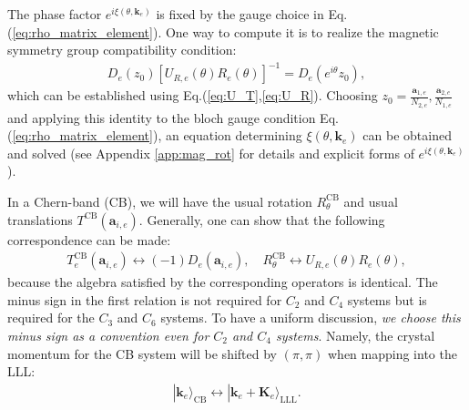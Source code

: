 The phase factor $e^{i \xi(\theta,\mathbf k_e)}$ is fixed by the gauge choice in Eq.(\ref{eq:rho_matrix_element}). One way to compute it is to realize the magnetic symmetry group compatibility condition:
\begin{align}
    [U_{R,e}(\theta)R_e(\theta)]D_e(z_0)[U_{R,e}(\theta)R_e(\theta)]^{-1}=D_e(e^{i\theta}z_0),\label{eq:R_T_identity}
\end{align}
which can be established using Eq.(\ref{eq:U_T},\ref{eq:U_R}). Choosing $z_0=\frac{\mathbf a_{1,e}}{N_{2,e}},\frac{\mathbf a_{2,e}}{N_{1,e}}$ and applying this identity to the bloch gauge condition Eq.(\ref{eq:rho_matrix_element}), an equation determining $\xi(\theta,\mathbf k_e)$ can be obtained and solved (see Appendix \ref{app:mag_rot} for details and explicit forms of $e^{i \xi(\theta,\mathbf k_e)}$).


In a Chern-band (CB), we will have the usual rotation $R^{\text{CB}}_{\theta}$ and usual translations $T^{\text{CB}}(\mathbf a_{i,e})$. Generally, one can show that the following correspondence can be made:
\begin{align}
    T_e^{\text{CB}}(\mathbf a_{i,e})\leftrightarrow (-1) D_e(\mathbf a_{i,e}),\quad R^{\text{CB}}_{\theta}\leftrightarrow U_{R,e}(\theta)R_e(\theta),\label{eq:CB_map_LLL_symmetry}
\end{align}
because the algebra satisfied by the corresponding operators is identical. The minus sign in the first relation is not required for $C_2$ and $C_4$ systems but is required for the $C_3$ and $C_6$ systems. To have a uniform discussion, \emph{we choose this minus sign as a convention even for $C_2$ and $C_4$ systems}. Namely, the crystal momentum for the CB system will be shifted by $(\pi,\pi)$ when mapping into the LLL:
\begin{align}
    |\mathbf k_e\rangle_{\text{CB}}\leftrightarrow |\mathbf k_e+\mathbf K_e\rangle_{\text{LLL}}.\label{eq:CB_LLL_map}
\end{align}

